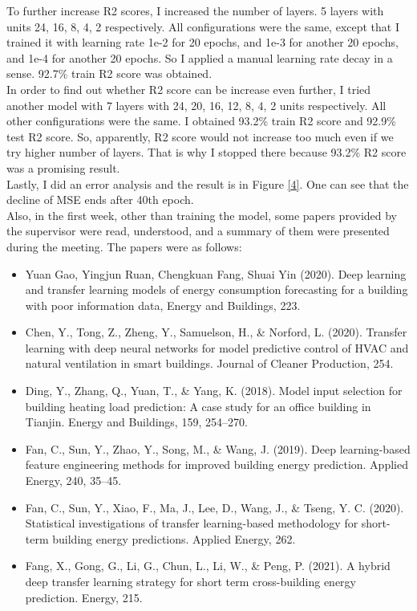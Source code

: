 \documentclass{article}
\begin{document}
To further increase R2 scores, I increased the number of layers. 5 layers with units 24, 16, 8, 4, 2 respectively. All configurations were the same, except that I trained it with learning rate 1e-2 for 20 epochs, and 1e-3 for another 20 epochs, and 1e-4 for another 20 epochs. So I applied a manual learning rate decay in a sense. 92.7\% train R2 score was obtained.\\

In order to find out whether R2 score can be increase even further, I tried another model with 7 layers with 24, 20, 16, 12, 8, 4, 2 units respectively. All other configurations were the same. I obtained 93.2\% train R2 score and 92.9\% test R2 score. So, apparently, R2 score would not increase too much even if we try higher number of layers. That is why I stopped there because 93.2\% R2 score was a promising result.\\

Lastly, I did an error analysis and the result is in Figure \ref{4}. One can see that the decline of MSE ends after 40th epoch.\\

Also, in the first week, other than training the model, some papers provided by the supervisor were read, understood, and a summary of them were presented during the meeting. The papers were as follows:
\begin{itemize}
    \item Yuan Gao, Yingjun Ruan, Chengkuan Fang, Shuai Yin (2020). Deep learning and transfer learning models of energy consumption forecasting for a building with poor information data, Energy and Buildings, 223.
    \item Chen, Y., Tong, Z., Zheng, Y., Samuelson, H., \& Norford, L. (2020). Transfer learning with deep neural networks for model predictive control of HVAC and natural ventilation in smart buildings. Journal of Cleaner Production, 254.
    \item Ding, Y., Zhang, Q., Yuan, T., \& Yang, K. (2018). Model input selection for building heating load prediction: A case study for an office building in Tianjin. Energy and Buildings, 159, 254–270.
    \item Fan, C., Sun, Y., Zhao, Y., Song, M., \& Wang, J. (2019). Deep learning-based feature engineering methods for improved building energy prediction. Applied Energy, 240, 35–45.
    \item Fan, C., Sun, Y., Xiao, F., Ma, J., Lee, D., Wang, J., \& Tseng, Y. C. (2020). Statistical investigations of transfer learning-based methodology for short-term building energy predictions. Applied Energy, 262.
    \item Fang, X., Gong, G., Li, G., Chun, L., Li, W., \& Peng, P. (2021). A hybrid deep transfer learning strategy for short term cross-building energy prediction. Energy, 215.
\end{itemize}
\end{document}
